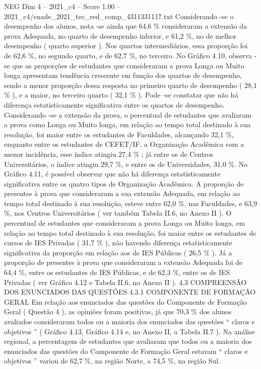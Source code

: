\begin{textsample}{NEG Dim 4 – 2021\_c4 – Score 1.00 – 2021\_c4/enade\_2021\_tec\_red\_comp\_4311331117.txt}
Considerando -se o desempenho dos alunos, nota -se ainda que 64,6 \% consideraram a extensão da prova Adequada, no quarto de desempenho inferior, e 61,2 \%, no de melhor desempenho ( quarto superior ).
Nos quartos intermediários, essa proporção foi de 62,6 \%, no segundo quarto, e de 62,7 \%, no terceiro.
No Gráfico 4.10, observa -se que as proporções de estudantes que consideraram a prova Longa ou Muito longa apresentam tendência crescente em função dos quartos de desempenho, sendo a menor proporção dessa resposta no primeiro quarto de desempenho ( 28,1 \% ), e a maior, no terceiro quarto ( 32,1 \% ).
Pode -se constatar que não há diferença estatisticamente significativa entre os quartos de desempenho.
Considerando -se a extensão da prova, o percentual de estudantes que avaliaram a prova como Longa ou Muito longa, em relação ao tempo total destinado à sua resolução, foi maior entre os estudantes de Faculdades, alcançando 32,1 \%, enquanto entre os estudantes de CEFET/IF, a Organização Acadêmica com a menor incidência, esse índice atingiu 27,4 \% ; já entre os de Centros Universitários, o índice atingiu 29,7 \%, e entre os de Universidades, 31,0 \%.
No Gráfico 4.11, é possível observar que não há diferença estatisticamente significativa entre os quatro tipos de Organização Acadêmica.
A proporção de presentes à prova que consideraram a sua extensão Adequada, em relação ao tempo total destinado à sua resolução, esteve entre 62,0 \%, nas Faculdades, e 63,9 \%, nos Centros Universitários ( ver também Tabela II.6, no Anexo II ).
O percentual de estudantes que consideraram a prova Longa ou Muito longa, em relação ao tempo total destinado à sua resolução, foi maior entre os estudantes de cursos de IES Privadas ( 31,7 \% ), não havendo diferença estatisticamente significativa da proporção em relação aos de IES Públicas ( 26,5 \% ).
Já a proporção de presentes à prova que consideraram a extensão Adequada foi de 64,4 \%, entre os estudantes de IES Públicas, e de 62,3 \%, entre os de IES Privadas ( ver Gráfico 4.12 e Tabela II.6, no Anexo II ). 4.3 COMPREENSÃO DOS ENUNCIADOS DAS QUESTÕES 4.3.1 COMPONENTE DE FORMAÇÃO GERAL Em relação aos enunciados das questões do Componente de Formação Geral ( Questão 4 ), as opiniões foram positivas, já que 70,3 \% dos alunos avaliados consideraram todos ou a maioria dos enunciados das questões “ claros e objetivos ” ( Gráfico 4.13, Gráfico 4.14 e, no Anexo II, a Tabela II.7 ).
Na análise regional, a percentagem de estudantes que avaliaram que todos ou a maioria dos enunciados das questões do Componente de Formação Geral estavam “ claros e objetivos ” variou de 62,7 \%, na região Norte, a 74,5 \%, na região Sul.

\end{textsample}
